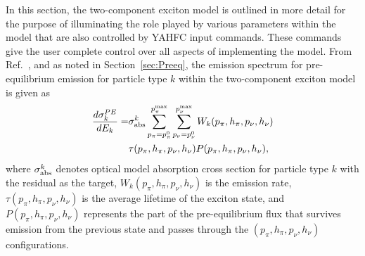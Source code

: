 \documentclass[
10pt,
showpacs,preprintnumbers,footinbib,
amsfonts,amsmath,amssymb,
aps,
prc,twocolumn,groupedaddress,superscriptaddress,
showkeys,
nofootinbib
]{revtex4-1}
\begin{document}
In this section, the two-component exciton model is outlined in more detail for the purpose of illuminating the role played by various parameters within the model that are also controlled by YAHFC input commands. These commands give the user complete control over all aspects of implementing the model. From Ref.~\cite{Koning:2004}, and as noted in Section~\ref{sec:Preeq}, the emission spectrum for pre-equilibrium emission for particle type $k$ within the two-component exciton model is given as
\begin{align}
\frac{d\sigma_k^{PE}}{dE_k}  =& \sigma_{\rm abs}^k 
     \sum_{p_\pi = p_\pi^0}^{p_\pi^{\rm max}}\sum_{p_\nu = p_\nu^0}^{p_\nu^{\rm max}}
     W_k(p_\pi,h_\pi,p_\nu,h_\nu) \notag \\
     & \tau(p_\pi,h_\pi,p_\nu,h_\nu) P(p_\pi,h_\pi,p_\nu,h_\nu),
\end{align}
where $\sigma^k_{\rm abs}$ denotes optical model absorption cross section for particle type $k$ with the residual as the target, $W_k(p_\pi,h_\pi,p_\nu,h_\nu)$ is the emission rate, $\tau(p_\pi,h_\pi,p_\nu,h_\nu)$ is the average lifetime of the exciton state, and $P(p_\pi,h_\pi,p_\nu,h_\nu)$ represents the part of the pre-equilibrium flux that survives emission from the previous state and passes through the $(p_\pi,h_\pi,p_\nu,h_\nu)$ configurations.
\end{document}
